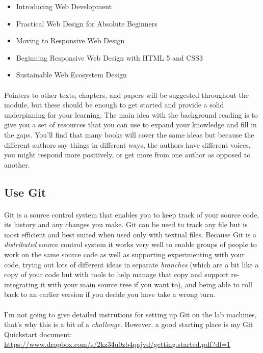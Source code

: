 \documentclass[10pt, a4paper]{article}
\begin{document}
\begin{itemize}

\item Introducing Web Development
\item Practical Web Design for Absolute Beginners
\item Moving to Responsive Web Design
\item Beginning Responsive Web Design with HTML 5 and CSS3
\item Sustainable Web Ecosystem Design

\end{itemize}

\paragraph{} Pointers to other texts, chapters, and papers will be suggested throughout the module, but these should be enough to get started and provide a solid underpinning for your learning. The main idea with the background reading is to give you a set of resources that you can use to expand your knowledge and fill in the gaps. You'll find that many books will cover the same ideas but because the different authors say things in different ways, the authors have different voices, you might respond more positively, or get more from one author as opposed to another.

\subsection{Use Git}
\paragraph{} Git is a source control system that enables you to keep track of your source code, its history and any changes you make. Git can be used to track any file but is most efficient and best suited when used only with textual files. Because Git is a \emph{distributed} source control system it works very well to enable groups of people to work on the same source code as well as supporting experimenting with your code, trying out lots of different ideas in separate \emph{branches} (which are a bit like a copy of your code but with tools to help manage that copy and support re-integrating it with your main source tree if you want to), and being able to roll back to an earlier version if you decide you have take a wrong turn.

\paragraph{} I'm not going to give detailed instrutions for setting up Git on the lab machines, that's why this is a bit of a \emph{challenge}. However, a good starting place is my Git Quickstart document: \url{https://www.dropbox.com/s/2kz34u0zb4qajvd/getting.started.pdf?dl=1}
\end{document}
